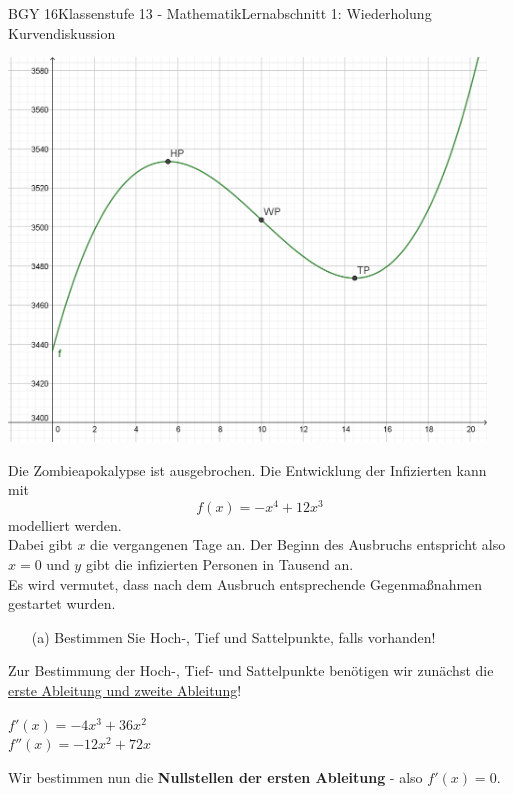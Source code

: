 \documentclass[oneside,openany,headings=optiontotoc,11pt,numbers=noenddot]{scrreprt}
\begin{document}
\begin{worksheet}{BGY 16}{Klassenstufe 13 - Mathematik}{Lernabschnitt 1: Wiederholung Kurvendiskussion}
\begin{framed}
\begin{center}
				\includegraphics[width=0.95\textwidth]{../99_Bilder/LSG1.png}
			\end{center}
		\end{framed}
		\newpage
		\begin{framed}
			\noindent
			Die Zombieapokalypse ist ausgebrochen. Die Entwicklung der Infizierten kann mit \[f(x) = -x^4 + 12x^3\] modelliert werden.\\
			Dabei gibt \(x\) die vergangenen Tage an. Der Beginn des Ausbruchs entspricht also \(x = 0\) und \(y\) gibt die infizierten Personen in Tausend an.\\
			Es wird vermutet, dass nach dem Ausbruch entsprechende Gegenmaßnahmen gestartet wurden.
		\end{framed}
		\begin{itemize}
			\item[(a)] Bestimmen Sie Hoch-, Tief und Sattelpunkte, falls vorhanden!
		\end{itemize}
		\begin{framed}
			\noindent
			Zur Bestimmung der Hoch-, Tief- und Sattelpunkte benötigen wir zunächst die \underline{erste Ableitung und zweite Ableitung}!\\
			\par\noindent
			\(f'(x) = -4x^3+36x^2\)\\
			\(f''(x) = -12x^2 + 72x\)\\
			\par\noindent
			Wir bestimmen nun die \textbf{Nullstellen der ersten Ableitung} - also \(f'(x) = 0\).
			\begin{tabularx}{\textwidth}{ll}

\end{tabularx}
\end{framed}
\end{worksheet}
\end{document}
